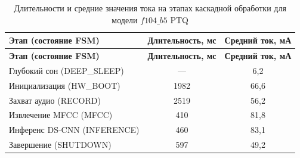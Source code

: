 \begin{longtable}{|p{4.5cm}|c|c|}
	\caption{Длительности и средние значения тока на этапах каскадной обработки для модели $f104\_b5$ PTQ}
	\label{tab:fsm_measurements}                                                         \\
	\hline
	\textbf{Этап (состояние FSM)} & \textbf{Длительность, мс} & \textbf{Средний ток, мА} \\
	\hline
	\endfirsthead
	\hline
	\textbf{Этап (состояние FSM)} & \textbf{Длительность, мс} & \textbf{Средний ток, мА} \\
	\hline
	\endhead
	\hline
	\endfoot
	Глубокий сон (DEEP\_SLEEP)    & ---                       & 6,2                      \\ \hline
	Инициализация (HW\_BOOT)      & 1982                      & 66,6                     \\ \hline
	Захват аудио (RECORD)         & 2519                      & 56,2                     \\ \hline
	Извлечение MFCC (MFCC)        & 410                       & 81,8                     \\ \hline
	Инференс DS-CNN (INFERENCE)   & 460                       & 83,1                     \\ \hline
	Завершение (SHUTDOWN)         & 597                       & 49,2                     \\
	\hline
\end{longtable}

